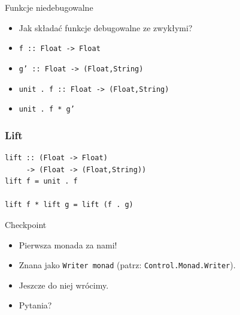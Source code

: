 \documentclass[14pt]{beamer}
\begin{document}
\begin{frame}{Funkcje niedebugowalne}
    \begin{itemize}
        \item Jak składać funkcje debugowalne ze zwykłymi?
        \item \texttt{f  :: Float -> Float}
        \item \texttt{g' :: Float -> (Float,String)}
        \pause
        \item \texttt{unit . f :: Float -> (Float,String)}
        \item \texttt{unit . f * g'}
    \end{itemize}
\end{frame}

\begin{frame}[fragile]
\frametitle{Lift}
\begin{verbatim}
lift :: (Float -> Float)
     -> (Float -> (Float,String))
lift f = unit . f

lift f * lift g = lift (f . g)
\end{verbatim}
\end{frame}

\begin{frame}{Checkpoint}
    \begin{itemize}
        \item Pierwsza monada za nami!
        \item Znana jako \texttt{Writer monad} (patrz: \texttt{Control.Monad.Writer}).
        \item Jeszcze do niej wrócimy.
        \pause
        \item Pytania?
    \end{itemize}
\end{frame}
\end{document}
